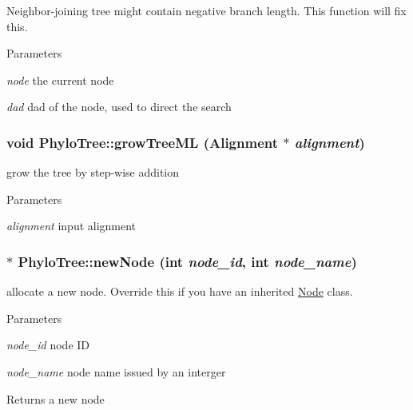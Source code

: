 \label{classPhyloTree_a80df879587ccb9aa1b9b54103e87ab8a}
Neighbor-\/joining tree might contain negative branch length. This function will fix this. 
\begin{DoxyParams}{Parameters}
\item[{\em node}]the current node \item[{\em dad}]dad of the node, used to direct the search \end{DoxyParams}
\hypertarget{classPhyloTree_a2de074f797940b19f9b1e923fe6c814a}{
\subsubsection[{growTreeML}]{\setlength{\rightskip}{0pt plus 5cm}void PhyloTree::growTreeML ({\bf Alignment} $\ast$ {\em alignment})}}
\label{classPhyloTree_a2de074f797940b19f9b1e923fe6c814a}
grow the tree by step-\/wise addition 
\begin{DoxyParams}{Parameters}
\item[{\em alignment}]input alignment \end{DoxyParams}
\hypertarget{classPhyloTree_a10e2a1d34d9f9751c42c262e1ef7581e}{
\subsubsection[{newNode}]{ $\ast$ PhyloTree::newNode (int {\em node\_\-id}, \/  int {\em node\_\-name})}}
\label{classPhyloTree_a10e2a1d34d9f9751c42c262e1ef7581e}
allocate a new node. Override this if you have an inherited \hyperlink{classNode}{Node} class. 
\begin{DoxyParams}{Parameters}
\item[{\em node\_\-id}]node ID \item[{\em node\_\-name}]node name issued by an interger \end{DoxyParams}
\begin{DoxyReturn}{Returns}
a new node 
\end{DoxyReturn}



